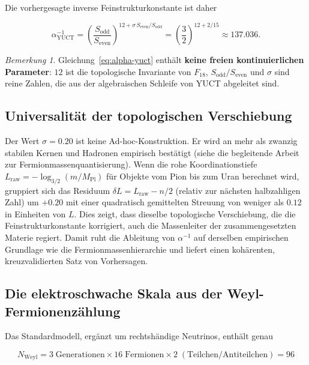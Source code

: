 \documentclass[12pt,a4paper]{article}
\theoremstyle{remark}
\newtheorem{remark}[theorem]{Bemerkung}
\begin{document}
	Die vorhergesagte inverse Feinstrukturkonstante ist daher
	
	\begin{equation}
		\boxed{\alpha^{-1}_{\mathrm{YUCT}} =
			\left(\frac{S_{\mathrm{odd}}}{S_{\mathrm{even}}}\right)^{12 + \sigma\,S_{\mathrm{even}}/S_{\mathrm{odd}}}
			= \left(\frac{3}{2}\right)^{12 + 2/15}
			\approx 137.036 } .
		\label{eq:alpha-yuct}
	\end{equation}
	
	\begin{remark}
		Gleichung~\eqref{eq:alpha-yuct} enthält \textbf{keine freien kontinuierlichen
			Parameter}: \(12\) ist die topologische Invariante von \(F_{18}\),
		\(S_{\mathrm{odd}}/S_{\mathrm{even}}\) und \(\sigma\) sind reine Zahlen,
		die aus der algebraischen Schleife von YUCT abgeleitet sind.
	\end{remark}
	
	\subsection{Universalität der topologischen Verschiebung}
	
	Der Wert \(\sigma = 0.20\) ist keine Ad-hoc-Konstruktion. Er wird an mehr als
	zwanzig stabilen Kernen und Hadronen empirisch bestätigt (siehe die begleitende
	Arbeit zur Fermionmassenquantisierung). Wenn die rohe Koordinationstiefe
	\(L_{\mathrm{raw}} = -\log_{3/2}(m/M_{\mathrm{Pl}})\) für Objekte vom Pion bis
	zum Uran berechnet wird, gruppiert sich das Residuum
	\(\delta L = L_{\mathrm{raw}} - n/2\) (relativ zur nächsten halbzahligen Zahl)
	um \(+0.20\) mit einer quadratisch gemittelten Streuung von weniger als
	\(0.12\) in Einheiten von \(L\). Dies zeigt, dass dieselbe topologische
	Verschiebung, die die Feinstrukturkonstante korrigiert, auch die Massenleiter
	der zusammengesetzten Materie regiert. Damit ruht die Ableitung von
	\(\alpha^{-1}\) auf derselben empirischen Grundlage wie die
	Fermionmassenhierarchie und liefert einen kohärenten, kreuzvalidierten Satz
	von Vorhersagen.
	
	\subsection{Die elektroschwache Skala aus der Weyl-Fermionenzählung}
	
	Das Standardmodell, ergänzt um rechtshändige Neutrinos, enthält genau
	
	\begin{equation}
		N_{\mathrm{Weyl}} = 3\;\text{Generationen} \times 16\;\text{Fermionen}
		\times 2\;(\text{Teilchen/Antiteilchen}) = 96
	\end{equation}
	
\end{document}
